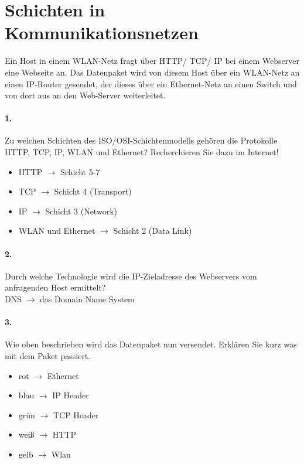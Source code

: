 \documentclass[paper=a4, fontsize=11pt]{scrartcl}
\numberwithin{equation}{section}
\numberwithin{figure}{section}
\numberwithin{table}{section}
\begin{document}

\section{Schichten in Kommunikationsnetzen}
Ein Host in einem WLAN-Netz fragt über HTTP/ TCP/ IP bei einem Webserver eine Webseite an. Das Datenpaket wird von diesem Host über ein WLAN-Netz an einen IP-Router gesendet, der dieses über ein Ethernet-Netz an einen Switch und von dort aus an den Web-Server weiterleitet. \\

\paragraph{1.}
Zu welchen Schichten des ISO/OSI-Schichtenmodells gehören die Protokolle HTTP, TCP, IP, WLAN und Ethernet? Recherchieren Sie dazu im Internet! \\

\begin{itemize}
\item HTTP $\rightarrow$ Schicht 5-7
\item TCP $\rightarrow$ Schicht 4 (Transport)
\item IP $\rightarrow$ Schicht 3 (Network)
\item WLAN und Ethernet $\rightarrow$ Schicht 2 (Data Link)
\end{itemize}

\paragraph{2.}
Durch welche Technologie wird die IP-Zieladresse des Webservers vom anfragenden Host ermittelt? \\

DNS $\rightarrow$ das Domain Name System

\paragraph{3.}
Wie oben beschrieben wird das Datenpaket nun versendet. Erklären Sie kurz was mit dem Paket passiert.

\begin{itemize}
\item rot $\rightarrow$ Ethernet
\item blau $\rightarrow$ IP Header
\item grün $\rightarrow$ TCP Header
\item weiß $\rightarrow$ HTTP
\item gelb $\rightarrow$ Wlan
\end{itemize}
\end{document}
